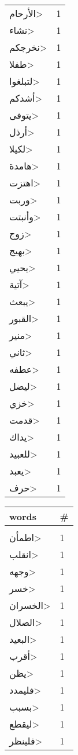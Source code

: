 \documentclass{article}
\begin{document}
\begin{multicols}{6}
\begin{center}
\begin{tabular}{ P{2cm}  P{1cm}}
\<الأرحام> & 1 \\ 
\<نشاء> & 1 \\ 
\<نخرجكم> & 1 \\ 
\<طفلا> & 1 \\ 
\<لتبلغوا> & 1 \\ 
\<أشدكم> & 1 \\ 
\<يتوفى> & 1 \\ 
\<أرذل> & 1 \\ 
\<لكيلا> & 1 \\ 
\<هامدة> & 1 \\ 
\<اهتزت> & 1 \\ 
\<وربت> & 1 \\ 
\<وأنبتت> & 1 \\ 
\<زوج> & 1 \\ 
\<بهيج> & 1 \\ 
\<يحيي> & 1 \\ 
\<آتية> & 1 \\ 
\<يبعث> & 1 \\ 
\<القبور> & 1 \\ 
\<منير> & 1 \\ 
\<ثاني> & 1 \\ 
\<عطفه> & 1 \\ 
\<ليضل> & 1 \\ 
\<خزي> & 1 \\ 
\<قدمت> & 1 \\ 
\<يداك> & 1 \\ 
\<للعبيد> & 1 \\ 
\<يعبد> & 1 \\ 
\<حرف> & 1 \\ 
\end{tabular} 
\begin{tabular}{ P{2cm}  P{1cm}} 
\textbf{words}    & \textbf{\#}  \\
\hline
\\[0.01cm]
\<اطمأن> & 1 \\ 
\<انقلب> & 1 \\ 
\<وجهه> & 1 \\ 
\<خسر> & 1 \\ 
\<الخسران> & 1 \\ 
\<الضلال> & 1 \\ 
\<البعيد> & 1 \\ 
\<أقرب> & 1 \\ 
\<يظن> & 1 \\ 
\<فليمدد> & 1 \\ 
\<بسبب> & 1 \\ 
\<ليقطع> & 1 \\ 
\<فلينظر> & 1 \\ 

\end{tabular}
\end{center}
\end{multicols}
\end{document}
